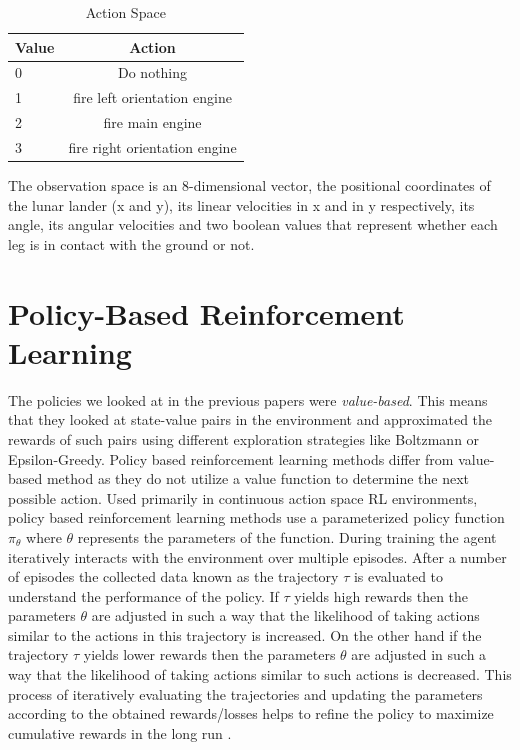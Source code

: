 \documentclass{article}
\begin{document}
\begin{table}[htbp]
\centering
\begin{tabular}{|l|c|}
\hline
\textbf{Value} & \textbf{Action} \\
\hline
0  & Do nothing \\
\hline
1 & fire left orientation engine \\
\hline
2  & fire main engine \\
\hline
3 & fire right orientation engine  \\
\hline
\end{tabular}
\caption{Action Space}
\label{tab:hyper-parameters}
\end{table}

The observation space is an 8-dimensional vector, the positional coordinates of the lunar lander (x and y), its linear velocities in x and in y respectively, its angle, its angular velocities and two boolean values that represent whether each leg is in contact with the ground or not. 

\section{Policy-Based Reinforcement Learning}
The policies we looked at in the previous papers were \emph{value-based}. This means that they looked at state-value pairs in the environment and approximated the rewards of such pairs using different exploration strategies like Boltzmann or Epsilon-Greedy. Policy based reinforcement learning methods differ from value-based method as they do not utilize a value function to determine the next possible action. Used primarily in  continuous action space RL environments, policy based reinforcement learning methods use a parameterized policy function $\pi_\theta$ where $\theta$ represents the parameters of the function.
During training the agent iteratively interacts with the environment over multiple episodes. After a number of episodes the collected data known as the trajectory $\tau$ is evaluated to understand the performance of the policy. If $\tau$ yields high rewards then the parameters $\theta$ are adjusted in such a way that the likelihood of taking actions similar to the actions in this trajectory is increased. On the other hand if the trajectory $\tau$ yields lower rewards then the parameters $\theta$ are adjusted in such a way that the likelihood of taking actions similar to such actions is decreased. This process of iteratively evaluating the trajectories and updating the parameters according to the obtained rewards/losses helps to refine the policy to maximize cumulative rewards in the long run \cite{plaat-deeprl}.
\end{document}
